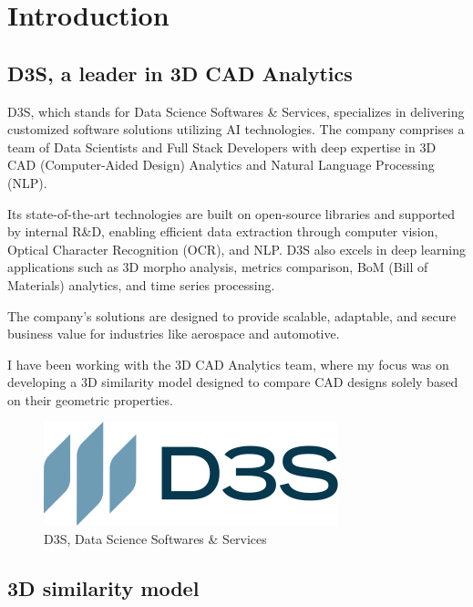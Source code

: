 \chapter{Introduction}
\label{chap:introduction}


\section{D3S, a leader in 3D CAD Analytics}

D3S, which stands for Data Science Softwares \& Services, specializes in delivering customized software solutions utilizing AI technologies. The company comprises a team of Data Scientists and Full Stack Developers with deep expertise in 3D CAD (Computer-Aided Design) Analytics and Natural Language Processing (NLP).  

Its state-of-the-art technologies are built on open-source libraries and supported by internal R\&D, enabling efficient data extraction through computer vision, Optical Character Recognition (OCR), and NLP. D3S also excels in deep learning applications such as 3D morpho analysis, metrics comparison, BoM (Bill of Materials) analytics, and time series processing. 

The company’s solutions are designed to provide scalable, adaptable, and secure business value for industries like aerospace and automotive.

\vspace{0.5cm}

I have been working with the 3D CAD Analytics team, where my focus was on developing a 3D similarity model designed to compare CAD designs solely based on their geometric properties.

\begin{figure}[]
    \centering
    \includegraphics[width=0.3\columnwidth]{images/d3s_logo.png}
    \caption{D3S, Data Science Softwares \& Services}
    \label{fig:d3s_logo}
\end{figure}

\section{3D similarity model}

